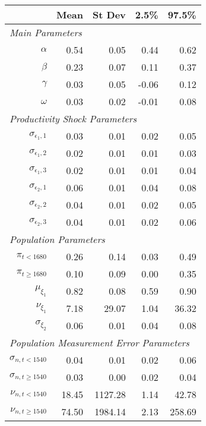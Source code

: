 \begin{tabular}{rrrrr} 
 \hline \hline 
& Mean & St Dev & \hspace{5pt} 2.5\% & 97.5\% \\ 
 \hline 
  \multicolumn{5}{l}{\textit{Main Parameters}} \\$\alpha$ & 0.54 & 0.05 & 0.44 & 0.62 \\ 
  $\beta$ & 0.23 & 0.07 & 0.11 & 0.37 \\ 
  $\gamma$ & 0.03 & 0.05 & -0.06 & 0.12 \\ 
  $\omega$ & 0.03 & 0.02 & -0.01 & 0.08 \\ 
   [0.5em] \multicolumn{5}{l}{\textit{Productivity Shock Parameters}} \\$\sigma_{\epsilon_1,1}$ & 0.03 & 0.01 & 0.02 & 0.05 \\ 
  $\sigma_{\epsilon_1,2}$ & 0.02 & 0.01 & 0.01 & 0.03 \\ 
  $\sigma_{\epsilon_1,3}$ & 0.02 & 0.01 & 0.01 & 0.04 \\ 
  $\sigma_{\epsilon_2,1}$ & 0.06 & 0.01 & 0.04 & 0.08 \\ 
  $\sigma_{\epsilon_2,2}$ & 0.04 & 0.01 & 0.02 & 0.05 \\ 
  $\sigma_{\epsilon_2,3}$ & 0.04 & 0.01 & 0.02 & 0.06 \\ 
   [0.5em] \multicolumn{5}{l}{\textit{Population Parameters}} \\$\pi_{t<1680}$ & 0.26 & 0.14 & 0.03 & 0.49 \\ 
  $\pi_{t \geq 1680}$ & 0.10 & 0.09 & 0.00 & 0.35 \\ 
  $\mu_{\xi_1}$ & 0.82 & 0.08 & 0.59 & 0.90 \\ 
  $\nu_{\xi_1}$ & 7.18 & 29.07 & 1.04 & 36.32 \\ 
  $\sigma_{\xi_2}$ & 0.06 & 0.01 & 0.04 & 0.08 \\ 
   [0.5em] \multicolumn{5}{l}{\textit{Population Measurement Error Parameters}} \\$\sigma_{n,t<1540}$ & 0.04 & 0.01 & 0.02 & 0.06 \\ 
  $\sigma_{n,t \geq 1540}$ & 0.03 & 0.00 & 0.02 & 0.04 \\ 
  $\nu_{n,t<1540}$ & 18.45 & 1127.28 & 1.14 & 42.78 \\ 
  $\nu_{n,t \geq 1540}$ & 74.50 & 1984.14 & 2.13 & 258.69 \\ 
   [0.5em] \hline 
\end{tabular} 
